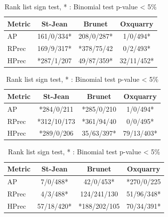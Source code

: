 \begin{table}[h]
  \centering
  \caption{Rank list sign test, * : Binomial test p-value < 5\%}
  \label{tab:fusion_sign_test_comparaisons}

  \label{tab:s_curve_single_max}
  \begin{tabular}{l c c c}
    \toprule
    Metric & St-Jean  & Brunet & Oxquarry \\ \midrule
    AP     & 161/0/334* & 208/0/287* & 1/0/494*\\
    RPrec  & 169/9/317* & *378/75/42 & 0/2/493*\\
    HPrec  & *287/1/207 & 49/87/359* & 32/11/452*\\
    \bottomrule
  \end{tabular}

  \label{tab:z_score_single_max}
  \begin{tabular}{l c c c}
    \toprule
    Metric& St-Jean  & Brunet & Oxquarry \\ \midrule
    AP    & *284/0/211  & *285/0/210 & 1/0/494*\\
    RPrec & *312/10/173 & *361/94/40 & 0/0/495*\\
    HPrec & *289/0/206  & 35/63/397* & 79/13/403*\\
    \bottomrule
  \end{tabular}

  \label{tab:s_curve_z_score}
  \begin{tabular}{l c c c}
    \toprule
    Metric & St-Jean & Brunet & Oxquarry \\ \midrule
    AP     & 7/0/488*   & 42/0/453*    & *270/0/225\\
    RPrec  & 4/3/488*   & 124/241/130  & 51/96/348*\\
    HPrec  & 57/18/420* & *188/202/105 & 70/34/391*\\
    \bottomrule
  \end{tabular}
\end{table}

